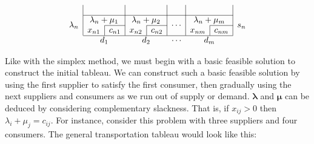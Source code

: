 \[\begin{array}{c|c|c|c|c|c|c|c|c|c}
		                               & \multicolumn{2}{c|}{}                            & \multicolumn{2}{c|}{}                            & \multicolumn{2}{c|}{}                            & \multicolumn{2}{c|}{}                            &                                                                              \\\cline{2-9}
		\multirow{2}{*}{\(\lambda_n\)} & \multicolumn{2}{c|}{\lambda_n + \mu_1}           & \multicolumn{2}{c|}{\lambda_n + \mu_2}           & \multicolumn{2}{c|}{\multirow{2}{*}{\(\cdots\)}} & \multicolumn{2}{c|}{\lambda_n + \mu_m}           & \multirow{2}{*}{\(s_n\)}                                                     \\\cline{3-3}\cline{5-5}\cline{9-9}
		                               & \multicolumn{1}{c|}{x_{n1}}                      & c_{n1}                                           & \multicolumn{1}{c|}{x_{n2}}                      & c_{n2}                                           & \multicolumn{2}{c|}{}               & \multicolumn{1}{c|}{x_{nm}} & c_{nm} & \\\cline{2-9}
		\multicolumn{1}{c}{}           & \multicolumn{2}{c}{d_1}                          & \multicolumn{2}{c}{d_2}                          & \multicolumn{2}{c}{\cdots}                       & \multicolumn{2}{c}{d_m}                          & \multicolumn{1}{c}{}
	\end{array}
\]

\noindent Like with the simplex method, we must begin with a basic feasible solution to construct the initial tableau.
We can construct such a basic feasible solution by using the first supplier to satisfy the first consumer, then gradually using the next suppliers and consumers as we run out of supply or demand.
\( \bm \lambda \) and \( \bm \mu \) can be deduced by considering complementary slackness.
That is, if \( x_{ij} > 0 \) then \( \lambda_i + \mu_j = c_{ij} \).
For instance, consider this problem with three suppliers and four consumers.
The general transportation tableau would look like this:


